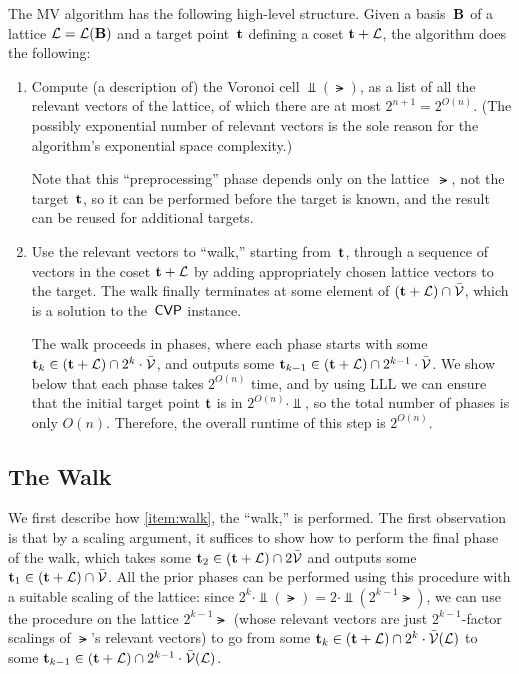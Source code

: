 \documentclass[11pt]{article}
\begin{document}
The MV algorithm has the following high-level structure.
Given a basis~$\mathbf{B}$ of a lattice $\mathcal{L} = \mathcal{L}(\mathbf{B})$ and a target point~$\mathbf{t}$ defining a coset $\mathbf{t} + \mathcal{L}$, the algorithm does the following:
\begin{enumerate}
\item Compute (a description of) the Voronoi cell $\Vbar(\lat)$, as a list of all the relevant vectors of the lattice, of which there are at most $2^{n+1} = 2^{O(n)}$.
  (The possibly exponential number of relevant vectors is the sole reason for the algorithm's exponential space complexity.)\label{item:compute-voronoi}

  Note that this ``preprocessing'' phase depends only on the lattice~$\lat$, not the target~$\mathbf{t}$, so it can be performed before the target is known, and the result can be reused for additional targets.

\item Use the relevant vectors to ``walk,'' starting from~$\mathbf{t}$, through a sequence of vectors in the coset $\mathbf{t}+\mathcal{L}$ by adding appropriately chosen lattice vectors to the target.
  The walk finally terminates at some element of $(\mathbf{t}+\mathcal{L}) \cap \bar{\mathcal{V}}$, which is a solution to the~$\mathsf{CVP}$ instance.\label{item:walk}

  The walk proceeds in phases, where each phase starts with some $\mathbf{t}_{k} \in (\mathbf{t}+\mathcal{L}) \cap 2^{k} \cdot \bar{\mathcal{V}}$, and outputs some $\mathbf{t}_{k-1} \in (\mathbf{t} + \mathcal{L}) \cap 2^{k-1} \cdot \bar{\mathcal{V}}$.
  We show below that each phase takes $2^{O(n)}$ time, and by using LLL we can ensure that the initial target point $\mathbf{t}$ is in $2^{O(n)} \cdot \Vbar$, so the total number of phases is only $O(n)$.
  Therefore, the overall runtime of this step is $2^{O(n)}$.
\end{enumerate}

\subsection{The Walk}%
\label{sec:walk}

We first describe how \cref{item:walk}, the ``walk,'' is performed.
The first observation is that by a scaling argument, it suffices to show how to perform the final phase of the walk, which takes some $\mathbf{t}_{2} \in (\mathbf{t}+\mathcal{L}) \cap 2 \bar{\mathcal{V}}$ and outputs some $\mathbf{t}_{1} \in (\mathbf{t}+\mathcal{L}) \cap \bar{\mathcal{V}}$.
All the prior phases can be performed using this procedure with a suitable scaling of the lattice: since $2^{k} \cdot \Vbar(\lat) = 2 \cdot \Vbar(2^{k-1} \lat)$, we can use the procedure on the lattice $2^{k-1} \lat$ (whose relevant vectors are just $2^{k-1}$-factor scalings of $\lat$'s relevant vectors) to go from some $\mathbf{t}_{k} \in (\mathbf{t}+\mathcal{L}) \cap 2^{k} \cdot \bar{\mathcal{V}}(\mathcal{L})$ to some $\mathbf{t}_{k-1} \in (\mathbf{t}+\mathcal{L}) \cap 2^{k-1} \cdot \bar{\mathcal{V}}(\mathcal{L})$.
\end{document}
